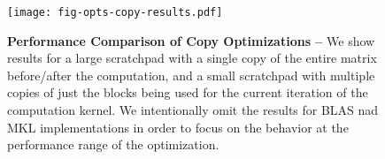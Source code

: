 
\begin{figure}

  \centering
  \texttt{[image: fig-opts-copy-results.pdf]}

  \caption{\textbf{Performance Comparison of Copy Optimizations --}
    We show results for a large scratchpad with a single copy of the
    entire matrix before/after the computation, and a small scratchpad
    with multiple copies of just the blocks being used for the current
    iteration of the computation kernel. We intentionally omit the
    results for BLAS nad MKL implementations in order to focus on the
    behavior at the performance range of the optimization.}

  \label{fig-opts-copy-results}

\end{figure}
